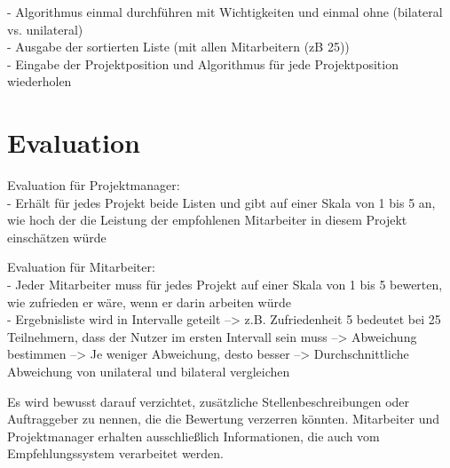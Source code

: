 - Algorithmus einmal durchführen mit Wichtigkeiten und einmal ohne (bilateral vs. unilateral)\\
- Ausgabe der sortierten Liste (mit allen Mitarbeitern (zB 25))\\
- Eingabe der Projektposition und Algorithmus für jede Projektposition wiederholen

\section{Evaluation}
\label{ch:methodik:evaluation}
Evaluation für Projektmanager:\\
- Erhält für jedes Projekt beide Listen und gibt auf einer Skala von 1 bis 5 an, wie hoch der die Leistung der empfohlenen Mitarbeiter in diesem Projekt einschätzen würde

Evaluation für Mitarbeiter:\\
- Jeder Mitarbeiter muss für jedes Projekt auf einer Skala von 1 bis 5 bewerten, wie zufrieden er wäre, wenn er darin arbeiten würde\\
- Ergebnisliste wird in Intervalle geteilt --> z.B. Zufriedenheit 5 bedeutet bei 25 Teilnehmern, dass der Nutzer im ersten Intervall sein muss --> Abweichung bestimmen --> Je weniger Abweichung, desto besser --> Durchschnittliche Abweichung von unilateral und bilateral vergleichen

Es wird bewusst darauf verzichtet, zusätzliche Stellenbeschreibungen oder Auftraggeber zu nennen, die die Bewertung verzerren könnten. Mitarbeiter und Projektmanager erhalten ausschließlich Informationen, die auch vom Empfehlungssystem verarbeitet werden.
